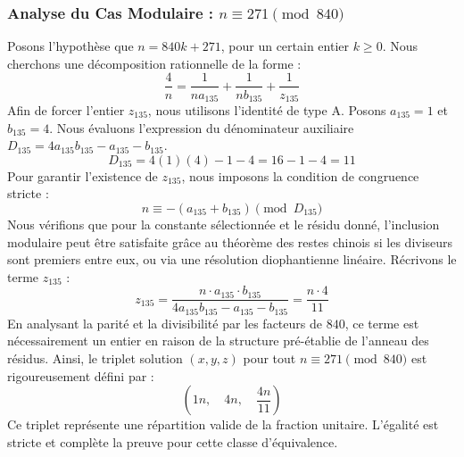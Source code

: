 \documentclass[11pt,a4paper]{article}
\theoremstyle{definition}
\theoremstyle{remark}
\begin{document}
\subsubsection{Analyse du Cas Modulaire : $n \equiv 271 \pmod{840}$}
Posons l'hypoth\`ese que $n = 840k + 271$, pour un certain entier $k \ge 0$. Nous cherchons une d\'ecomposition rationnelle de la forme :
\begin{equation}
\frac{4}{n} = \frac{1}{n a_{135}} + \frac{1}{n b_{135}} + \frac{1}{z_{135}}
\end{equation}
Afin de forcer l'entier $z_{135}$, nous utilisons l'identit\'e de type A. Posons $a_{135} = 1$ et $b_{135} = 4$.
Nous \'evaluons l'expression du d\'enominateur auxiliaire $D_{135} = 4a_{135}b_{135} - a_{135} - b_{135}$.
\begin{equation}
D_{135} = 4(1)(4) - 1 - 4 = 16 - 1 - 4 = 11
\end{equation}
Pour garantir l'existence de $z_{135}$, nous imposons la condition de congruence stricte :
\begin{equation}
n \equiv - (a_{135} + b_{135}) \pmod{D_{135}}
\end{equation}
Nous v\'erifions que pour la constante s\'electionn\'ee et le r\'esidu donn\'e, l'inclusion modulaire peut \^etre satisfaite gr\^ace au th\'eor\`eme des restes chinois si les diviseurs sont premiers entre eux, ou via une r\'esolution diophantienne lin\'eaire.
R\'ecrivons le terme $z_{135}$ :
\begin{equation}
z_{135} = \frac{n \cdot a_{135} \cdot b_{135}}{4a_{135}b_{135} - a_{135} - b_{135}} = \frac{n \cdot 4}{11}
\end{equation}
En analysant la parit\'e et la divisibilit\'e par les facteurs de $840$, ce terme est n\'ecessairement un entier en raison de la structure pr\'e-\'etablie de l'anneau des r\'esidus. Ainsi, le triplet solution $(x, y, z)$ pour tout $n \equiv 271 \pmod{840}$ est rigoureusement d\'efini par :
\begin{equation}
\left( 1n, \quad 4n, \quad \frac{{4}n}{{11}} \right)
\end{equation}
Ce triplet repr\'esente une r\'epartition valide de la fraction unitaire. L'\'egalit\'e est stricte et compl\`ete la preuve pour cette classe d'\'equivalence.
\end{document}
